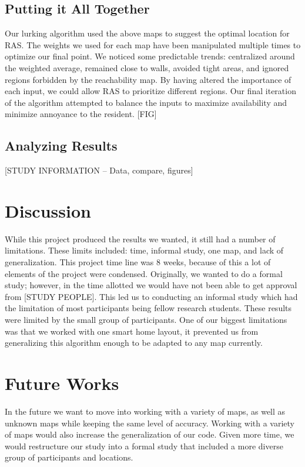 \documentclass[11pt, draft, a4paper]{IEEEtran}
\begin{document}
\subsection{Putting it All Together}
Our lurking algorithm used the above maps to suggest the optimal location for RAS. The weights we used for each map have been manipulated multiple times to optimize our final point. We noticed some predictable trends: centralized around the weighted average, remained close to walls, avoided tight areas, and ignored regions forbidden by the reachability map. By having altered the importance of each input, we could allow RAS to prioritize different regions. Our final iteration of the algorithm attempted to balance the inputs to maximize availability and minimize annoyance to the resident. [FIG]


\subsection{Analyzing Results}
[STUDY INFORMATION -- Data, compare, figures]


\section{Discussion}
While this project produced the results we wanted, it still had a number of limitations. These limits included: time, informal study, one map, and lack of generalization. This project time line was 8 weeks, because of this a lot of elements of the project were condensed. Originally, we wanted to do a formal study; however, in the time allotted we would have not been able to get approval from [STUDY PEOPLE]. This led us to conducting an informal study which had the limitation of most participants being fellow research students. These results were limited by the small group of participants. One of our biggest limitations was that we worked with one smart home layout, it prevented us from generalizing this algorithm enough to be adapted to any map currently. 


\section{Future Works}
In the future we want to move into working with a variety of maps, as well as unknown maps while keeping the same level of accuracy. Working with a variety of maps would also increase the generalization of our code. Given more time, we would restructure our study into a formal study that included a more diverse group of participants and locations. 
\end{document}
